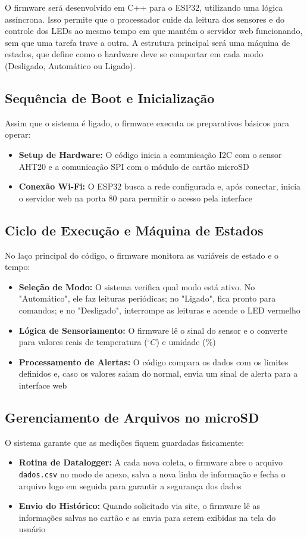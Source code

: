 O firmware será desenvolvido em C++ para o ESP32, utilizando uma lógica assíncrona. Isso permite que o processador cuide da leitura dos sensores e do controle dos LEDs ao mesmo tempo em que mantém o servidor web funcionando, sem que uma tarefa trave a outra. A estrutura principal será uma máquina de estados, que define como o hardware deve se comportar em cada modo (Desligado, Automático ou Ligado).

\subsection{Sequência de Boot e Inicialização}
Assim que o sistema é ligado, o firmware executa os preparativos básicos para operar:
\begin{itemize}
    \item \textbf{Setup de Hardware:} O código inicia a comunicação I2C com o sensor AHT20 e a comunicação SPI com o módulo de cartão microSD
    \item \textbf{Conexão Wi-Fi:} O ESP32 busca a rede configurada e, após conectar, inicia o servidor web na porta 80 para permitir o acesso pela interface
\end{itemize}

\subsection{Ciclo de Execução e Máquina de Estados}
No laço principal do código, o firmware monitora as variáveis de estado e o tempo:
\begin{itemize}
    \item \textbf{Seleção de Modo:} O sistema verifica qual modo está ativo. No "Automático", ele faz leituras periódicas; no "Ligado", fica pronto para comandos; e no "Desligado", interrompe as leituras e acende o LED vermelho
    \item \textbf{Lógica de Sensoriamento:} O firmware lê o sinal do sensor e o converte para valores reais de temperatura ($^{\circ}C$) e umidade (\%)
    \item \textbf{Processamento de Alertas:} O código compara os dados com os limites definidos e, caso os valores saiam do normal, envia um sinal de alerta para a interface web
\end{itemize}

\subsection{Gerenciamento de Arquivos no microSD}
O sistema garante que as medições fiquem guardadas fisicamente:
\begin{itemize}
    \item \textbf{Rotina de Datalogger:} A cada nova coleta, o firmware abre o arquivo \texttt{dados.csv} no modo de anexo, salva a nova linha de informação e fecha o arquivo logo em seguida para garantir a segurança dos dados
    \item \textbf{Envio do Histórico:} Quando solicitado via site, o firmware lê as informações salvas no cartão e as envia para serem exibidas na tela do usuário
\end{itemize}

